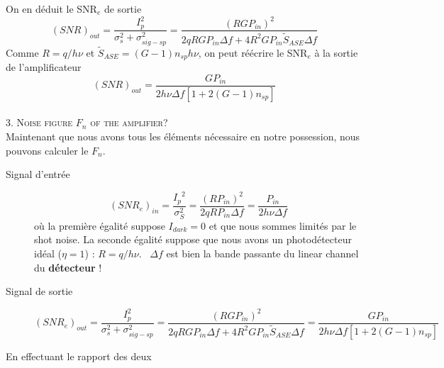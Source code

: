 On en déduit le SNR$_e$ de sortie
\begin{equation}
{(SNR)_{out}} = \frac{{I_p^2}}{{\sigma _s^2 + \sigma _{sig - sp}^2}} = \frac{{{{(RG{P_{in}})}^2}}}{{2qRG{P_{in}}\Delta f + 4{R^2}G{P_{in}}{{\tilde S}_{ASE}}\Delta f}}
\end{equation}
Comme $R=q/h\nu$ et $\tilde{S}_{ASE} =(G-1)n_{sp}h\nu$, on peut réécrire le SNR$_e$ à la sortie de 
l'amplificateur
\begin{equation}
{(SNR)_{out}} = \frac{{G{P_{in}}}}{{2h\nu \Delta f[1 + 2(G - 1){n_{sp}}]}}
\end{equation}
\ \\

\textsc{3. Noise figure $F_n$ of the amplifier?}\\
Maintenant que nous avons tous les éléments nécessaire en notre possession, nous pouvons calculer le $F_n$. 

\begin{description}
\item[Signal d'entrée]
\begin{equation}
{(SN{R_e})_{in}} = \frac{{{I_p}^2}}{{\sigma _S^2}} = \frac{{{{(R{P_{in}})}^2}}}{{2qR{P_{in}}\Delta f}} = \frac{{{P_{in}}}}{{2h\nu \Delta f}}
\end{equation}
où la première égalité suppose $I_{dark}=0$ et que nous sommes limités par le shot noise. La seconde 
égalité suppose que nous avons un photodétecteur idéal ($\eta=1$) : $R=q/h\nu$. \danger\ $\Delta f$ est
bien la bande passante du linear channel du \textbf{détecteur} !

\item[Signal de sortie]
\begin{equation}
{(SN{R_e})_{out}} = \frac{{I_p^2}}{{\sigma _s^2 + \sigma _{sig - sp}^2}} = \frac{{{{(RG{P_{in}})}^2}}}{{2qRG{P_{in}}\Delta f + 4{R^2}G{P_{in}}{{\tilde S}_{ASE}}\Delta f}} = \frac{{G{P_{in}}}}{{2h\nu \Delta f[1 + 2(G - 1){n_{sp}}]}}
\end{equation}
\end{description}

En effectuant le rapport des deux\\

\ \\


